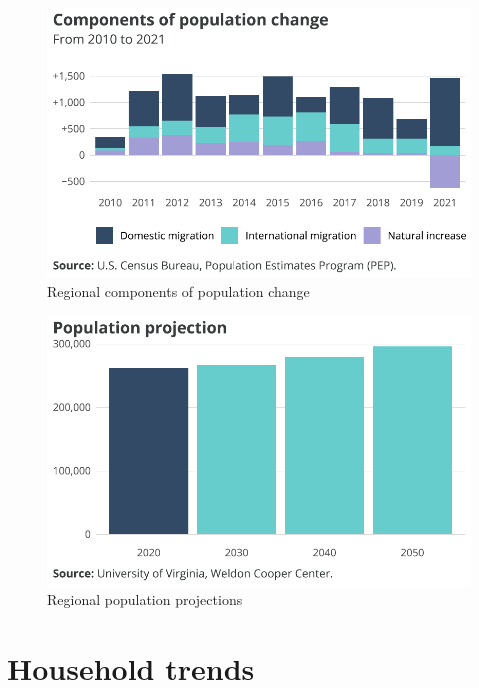 \documentclass[
  letterpaper,
  DIV=11,
  numbers=noendperiod]{scrreprt}
\begin{document}
\begin{figure}[H]

{\centering \includegraphics{./part-3-1_files/figure-pdf/fig-pchange-1.pdf}

}

\caption{\label{fig-pchange}Regional components of population change}

\end{figure}

\begin{figure}[H]

{\centering \includegraphics{./part-3-1_files/figure-pdf/fig-projections-1.pdf}

}

\caption{\label{fig-projections}Regional population projections}

\end{figure}

\hypertarget{household-trends}{%
\section{Household trends}\label{household-trends}}
\end{document}

